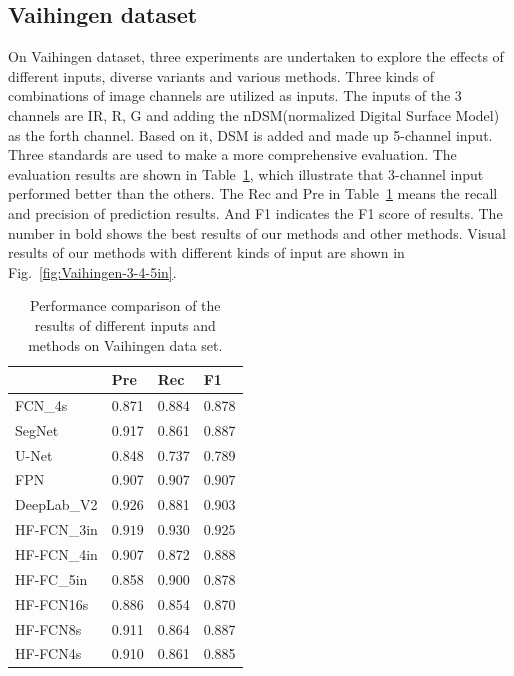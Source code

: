 \subsection{Vaihingen dataset}
On Vaihingen dataset, three experiments are undertaken to explore the effects of different inputs, diverse variants and various methods. Three kinds of combinations of image channels are utilized as inputs. The inputs of the 3 channels are IR, R, G and adding the nDSM(normalized Digital Surface Model) as the forth channel. Based on it, DSM is added and made up 5-channel input. Three standards are used to make a more comprehensive evaluation. The evaluation results are shown in Table~\ref{table:vaihigen-3-4-5in-comp}, which illustrate that 3-channel input performed better than the others.
The Rec and Pre in Table~\ref{table:vaihigen-3-4-5in-comp} means the recall and precision of prediction results. And F1 indicates the F1 score of results.
The number in bold shows the best results of our methods and other methods.
Visual results of our methods with different kinds of input are shown in Fig.~\ref{fig:Vaihingen-3-4-5in}.



\begin{table}[htbp]
\caption {Performance comparison of the results of different inputs and methods on Vaihingen data set.}
\label{table:vaihigen-3-4-5in-comp}
\centering
\begin{tabular}{p{2.5cm}<{\centering}|p{1.1cm}<{\centering}|p{1.1cm}<{\centering}|p{1.1cm}<{\centering}}
\hline
&Pre&Rec&F1\\
\hline
FCN\_4s\cite{IEEEexample:Long_2015_CVPR}&{0.871}&0.884&{0.878}\\
SegNet\cite{IEEEexample:badrinarayanan2017segnet}&{0.917}&{0.861}&{0.887}\\
U-Net\cite{IEEEexample:ronneberger2015u}&{0.848}&{0.737}&{0.789}\\
FPN\cite{IEEEexample:lin2017feature}&{0.907}&$\bm{0.907}$&$\bm{0.907}$\\
DeepLab\_V2\cite{IEEEexample:chen2016deeplab}&$\bm{0.926}$&{0.881}&0.903\\
\hline \hline
HF-FCN\_3in&$\bm{0.919}$&$\bm{0.930}$&$\bm{0.925}$\\
HF-FCN\_4in&0.907&0.872&0.888\\
HF-FC\_5in&0.858&0.900&0.878\\
HF-FCN16s&{0.886}&{0.854}&{0.870}\\
HF-FCN8s&{0.911}&{0.864}&{0.887}\\
HF-FCN4s&{0.910}&{0.861}&{0.885}\\
\hline
\end{tabular}
\end{table}

